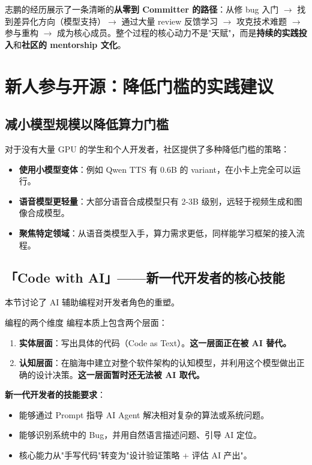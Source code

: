 \documentclass[a4paper]{article}
\begin{document}
志鹏的经历展示了一条清晰的\textbf{从零到 Committer 的路径}：从修 bug 入门 $\rightarrow$ 找到差异化方向（模型支持）$\rightarrow$ 通过大量 review 反馈学习 $\rightarrow$ 攻克技术难题 $\rightarrow$ 参与重构 $\rightarrow$ 成为核心成员。整个过程的核心动力不是"天赋"，而是\textbf{持续的实践投入}和\textbf{社区的 mentorship 文化}。

\newpage
\section{新人参与开源：降低门槛的实践建议}

\subsection{减小模型规模以降低算力门槛}

对于没有大量 GPU 的学生和个人开发者，社区提供了多种降低门槛的策略：

\begin{itemize}
\item \textbf{使用小模型变体}：例如 Qwen TTS 有 0.6B 的 variant，在小卡上完全可以运行。
\item \textbf{语音模型更轻量}：大部分语音合成模型只有 2-3B 级别，远轻于视频生成和图像合成模型。
\item \textbf{聚焦特定领域}：从语音类模型入手，算力需求更低，同样能学习框架的接入流程。
\end{itemize}

\subsection{「Code with AI」——新一代开发者的核心技能}

本节讨论了 AI 辅助编程对开发者角色的重塑。

\begin{importantbox}{编程的两个维度}
编程本质上包含两个层面：
\begin{enumerate}
\item \textbf{实体层面}：写出具体的代码（Code as Text）。\textbf{这一层面正在被 AI 替代。}
\item \textbf{认知层面}：在脑海中建立对整个软件架构的认知模型，并利用这个模型做出正确的设计决策。\textbf{这一层面暂时还无法被 AI 取代。}
\end{enumerate}
\end{importantbox}

\textbf{新一代开发者的技能要求}：

\begin{itemize}
\item 能够通过 Prompt 指导 AI Agent 解决相对复杂的算法或系统问题。
\item 能够识别系统中的 Bug，并用自然语言描述问题、引导 AI 定位。
\item 核心能力从"手写代码"转变为"设计验证策略 + 评估 AI 产出"。
\end{itemize}
\end{document}
